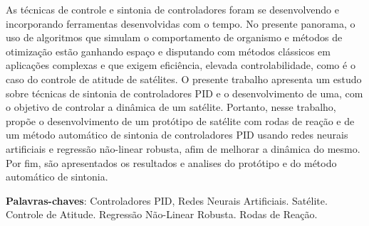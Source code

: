 \setlength{\absparsep}{18pt} %
\begin{resumo}
    As técnicas de controle e sintonia de controladores foram se desenvolvendo e incorporando ferramentas desenvolvidas com o tempo. No presente panorama, o  uso de algoritmos que simulam o comportamento de organismo e métodos de otimização estão ganhando espaço e disputando com métodos clássicos em aplicações complexas e que exigem eficiência, elevada controlabilidade, como é o caso do controle de atitude de satélites. O presente trabalho apresenta um estudo sobre técnicas de sintonia de controladores PID e o desenvolvimento de uma, com o objetivo de controlar a dinâmica de um satélite. Portanto, nesse trabalho, propõe o desenvolvimento de um protótipo de satélite com rodas de reação e de um método automático de sintonia de controladores PID usando redes neurais artificiais e regressão não-linear robusta, afim de melhorar a dinâmica do mesmo. Por fim, são apresentados os resultados e analises do protótipo e do método automático de sintonia.
	\vspace{\onelineskip}
	\noindent 
	
	\textbf{Palavras-chaves}: Controladores PID, Redes Neurais Artificiais. Satélite. Controle de Atitude. Regressão Não-Linear Robusta. Rodas de Reação. 
\end{resumo}

 
